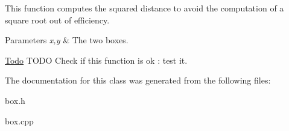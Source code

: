This function computes the squared distance to avoid the computation of a square root out of efficiency.


\begin{DoxyParams}{Parameters}
{\em x,y} & The two boxes. \\
\hline
\end{DoxyParams}
\begin{Desc}
\item[\hyperlink{todo__todo000001}{Todo}]TODO Check if this function is ok : test it. \end{Desc}


The documentation for this class was generated from the following files:\begin{DoxyCompactItemize}
\item 
box.h\item 
box.cpp\end{DoxyCompactItemize}

